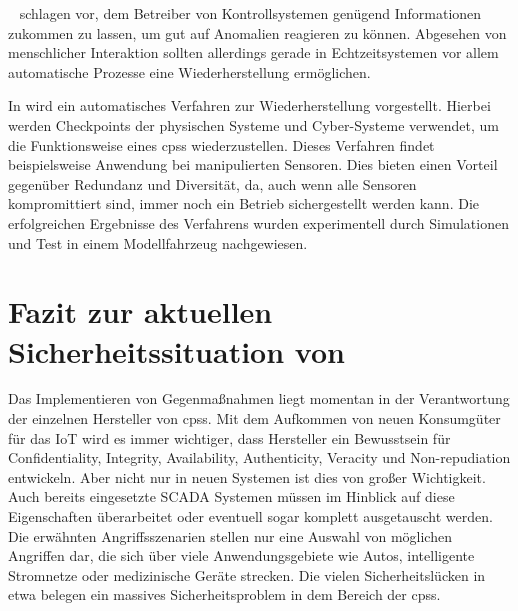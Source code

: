 \documentclass[final,bibliography=totocnumbered]{include/sikseminar}
\newcommand{\cps}{\glspl{cps}\xspace}
\begin{document}
    \citeauthor{CAS+09}~\cite{CAS+09} schlagen vor, dem Betreiber von Kontrollsystemen genügend Informationen zukommen zu lassen, um gut auf Anomalien reagieren zu können.
    Abgesehen von menschlicher Interaktion sollten allerdings gerade in Echtzeitsystemen vor allem automatische Prozesse eine Wiederherstellung ermöglichen.

    In \cite{KXW+18} wird ein automatisches Verfahren zur Wiederherstellung vorgestellt.
    Hierbei werden Checkpoints der physischen Systeme und Cyber-Systeme verwendet, um die Funktionsweise eines \cps wiederzustellen.
    Dieses Verfahren findet beispielsweise Anwendung bei manipulierten Sensoren.
    Dies bieten einen Vorteil gegenüber Redundanz und Diversität, da, auch wenn alle Sensoren kompromittiert sind, immer noch ein Betrieb sichergestellt werden kann.
    Die erfolgreichen Ergebnisse des Verfahrens wurden experimentell durch Simulationen und Test in einem Modellfahrzeug nachgewiesen.

    \section{Fazit zur aktuellen Sicherheitssituation von }
    \label{sec:fazit-security-situation}
    Das Implementieren von Gegenmaßnahmen liegt momentan in der Verantwortung der einzelnen Hersteller von \cps.
    Mit dem Aufkommen von neuen Konsumgüter für das IoT wird es immer wichtiger, dass Hersteller ein Bewusstsein für Confidentiality, Integrity, Availability, Authenticity, Veracity und Non-repudiation entwickeln.
    Aber nicht nur in neuen Systemen ist dies von großer Wichtigkeit.
    Auch bereits eingesetzte SCADA Systemen müssen im Hinblick auf diese Eigenschaften überarbeitet oder eventuell sogar komplett ausgetauscht werden.
    Die erwähnten Angriffsszenarien stellen nur eine Auswahl von möglichen Angriffen dar, die sich über viele Anwendungsgebiete wie Autos, intelligente Stromnetze oder medizinische Geräte strecken.
    Die vielen Sicherheitslücken in etwa \cite{HLL+17} belegen ein massives Sicherheitsproblem in dem Bereich der \cps.
\end{document}
